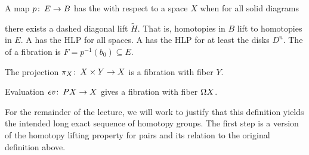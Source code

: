 \begin{definition}
A map $p\colon\thinspace E \to B$
has the  with respect to a space $X$ when for all solid diagrams
\begin{center}
\end{center}
there exists a dashed diagonal lift $\widetilde H$.
That is, homotopies in $B$ lift to homotopies in $E$.
A  has the HLP for all spaces.
A  has the HLP for at least the disks $D^n$.
The  of a fibration is $F = p^{-1}(b_0) \subseteq E$.
\end{definition}

\begin{example}
The projection $\pi_X\colon\thinspace X \times Y \to X$ is a fibration with fiber $Y$.
\end{example}

\begin{example}
Evaluation $\mathit{ev}\colon\thinspace PX \to X$ gives a fibration with fiber $\Omega X$.
\end{example}

For the remainder of the lecture, we will work to justify that this definition yields the intended long exact sequence of homotopy groups.
The first step is a version of the homotopy lifting property for pairs and its relation to the original definition above.

